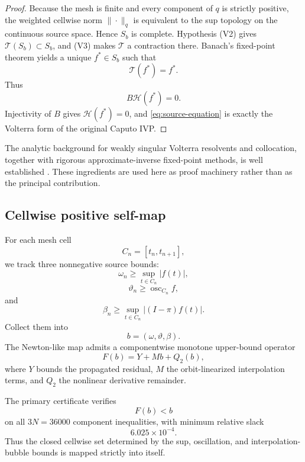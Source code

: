 \begin{proof}
Because the mesh is finite and every component of \(q\) is strictly positive, the weighted cellwise norm \(\|\cdot\|_q\) is equivalent to the sup topology on the continuous source space. Hence \(S_b\) is complete. Hypothesis (V2) gives \(\mathcal T(S_b)\subset S_b\), and (V3) makes \(\mathcal T\) a contraction there. Banach's fixed-point theorem yields a unique \(f^*\in S_b\) such that
\[
  \mathcal T(f^*)=f^*.
\]
Thus
\[
  B\mathcal H(f^*)=0.
\]
Injectivity of \(B\) gives \(\mathcal H(f^*)=0\), and \eqref{eq:source-equation} is exactly the Volterra form of the original Caputo IVP.
\end{proof}

The analytic background for weakly singular Volterra resolvents and collocation, together with rigorous approximate-inverse fixed-point methods, is well established
\cite{Becker2011WeaklySingularResolvents,BrunnerPedasVainikko1999WeaklySingularCollocation,LiangBrunner2019WeaklySingularCollocation,BredenLessard2018PolynomialCAP,ChurchQueirolo2024HopfCAP}. These ingredients are used here as proof machinery rather than as the principal contribution.

\subsection{Cellwise positive self-map}

For each mesh cell
\[
  C_n=[t_n,t_{n+1}],
\]
we track three nonnegative source bounds:
\[
  \omega_n
  \ge
  \sup_{t\in C_n}|f(t)|,
\]
\[
  \vartheta_n
  \ge
  \operatorname{osc}_{C_n}f,
\]
and
\[
  \beta_n
  \ge
  \sup_{t\in C_n}|(I-\pi)f(t)|.
\]
Collect them into
\[
  b=(\omega,\vartheta,\beta).
\]
The Newton-like map admits a componentwise monotone upper-bound operator
\begin{equation}
  F(b)
  =
  Y+Mb+Q_2(b),
  \label{eq:positive-bound-map}
\end{equation}
where \(Y\) bounds the propagated residual, \(M\) the orbit-linearized interpolation terms, and \(Q_2\) the nonlinear derivative remainder.

The primary certificate verifies
\begin{equation}
  F(b)<b
  \label{eq:self-map-vector}
\end{equation}
on all \(3N=36000\) component inequalities, with minimum relative slack
\begin{equation}
  6.025\times10^{-4}.
  \label{eq:self-map-slack}
\end{equation}
Thus the closed cellwise set determined by the sup, oscillation, and interpolation-bubble bounds is mapped strictly into itself.

